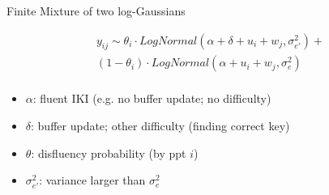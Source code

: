 \begin{frame}[fragile]{Finite Mixture of two log-Gaussians}
	
		\begin{equation*}
			\begin{aligned}
				y_{ij} \sim \theta_{i} \cdot LogNormal(\alpha + \delta + u_i + w_j, \sigma_{e'}^2) + \\
					(1 - \theta_{i}) \cdot LogNormal(\alpha + u_i + w_j, \sigma_{e}^2) \\
			\end{aligned}
		\end{equation*}
		\begin{small}
			\begin{itemize}
				\item $\alpha$: fluent IKI (e.g. no buffer update; no difficulty)
				\item $\delta$: buffer update; other difficulty (finding correct key)
				\item $\theta$: disfluency probability (by ppt $i$)	
				\item $\sigma_{e'}^2$: variance larger than $\sigma_{e}^2$ 
			\end{itemize}
		\end{small}		
	
\end{frame}